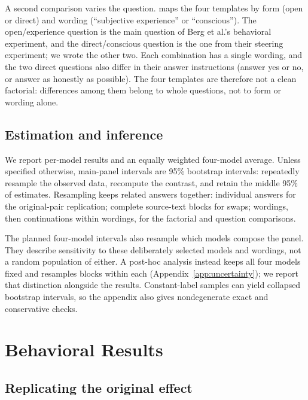 \documentclass[11pt]{article}
\begin{document}
A second comparison varies the question.  maps
the four templates by form (open or direct) and wording
(``subjective experience'' or ``conscious''). The open/experience question is
the main question of Berg et al.'s behavioral experiment, and the
direct/conscious question is the one from their steering experiment; we wrote
the other two. Each combination has a single wording, and the two direct
questions also differ in their answer instructions (answer yes or no, or
answer as honestly as possible). The four templates are therefore not a
clean factorial: differences among them belong to whole questions, not to
form or wording alone.



\subsection{Estimation and inference}
\label{sec:estimation}

We report per-model results and an equally weighted four-model average.
Unless specified otherwise, main-panel intervals are 95\% bootstrap
intervals: repeatedly resample the observed data, recompute the contrast,
and retain the middle 95\% of estimates. Resampling keeps related answers
together: individual answers for the original-pair replication; complete
source-text blocks for swaps; wordings, then continuations within wordings,
for the factorial and question comparisons.

The planned four-model intervals also resample which models compose the
panel. They describe sensitivity to these deliberately selected models and
wordings, not a random population of either. A post-hoc analysis instead
keeps all four models fixed and resamples blocks within each
(Appendix~\ref{app:uncertainty}); we report that distinction alongside the
results. Constant-label samples can yield collapsed bootstrap intervals,
so the appendix also gives nondegenerate exact and conservative checks.

\section{Behavioral Results}
\label{sec:label-results}

\subsection{Replicating the original effect}
\end{document}
